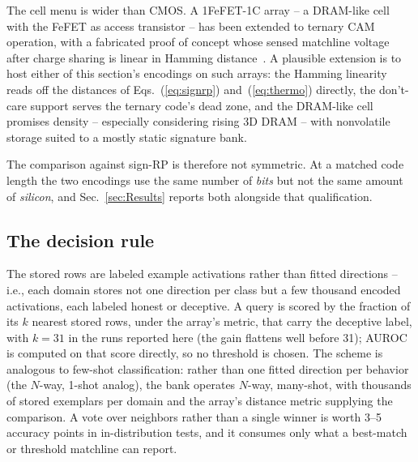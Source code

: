\documentclass[conference]{IEEEtran}
\newcommand{\cam}{{CAM}\xspace}
\newcommand{\fefet}{{FeFET}\xspace}
\newcommand{\auroc}{{AUROC}\xspace}
\newcommand{\signrp}{{sign-RP}\xspace}
\begin{document}
The cell menu is wider than CMOS. A 1\fefet-1C array -- a DRAM-like
cell with the \fefet as access transistor -- has been extended to
ternary \cam operation, with a fabricated proof of concept whose
sensed matchline voltage after charge sharing is linear in Hamming
distance~\cite{fefet1c2026}. A plausible extension is to host either
of this section's encodings on such arrays: the Hamming linearity
reads off the distances of Eqs.~(\ref{eq:signrp})
and~(\ref{eq:thermo}) directly, the don't-care support serves the
ternary code's dead zone, and the DRAM-like cell promises density --
especially considering rising 3D DRAM -- with nonvolatile storage
suited to a mostly static signature bank.

The comparison against \signrp is therefore not symmetric. At a matched
code length the two encodings use the same number of \emph{bits} but not
the same amount of \emph{silicon}, and Sec.~\ref{sec:Results} reports
both alongside that qualification.

\subsection{The decision rule}

\label{subsec:Decision}
The stored rows are labeled example activations rather than fitted
directions -- i.e., each domain stores not one direction per class
but a few thousand encoded activations, each labeled honest or
deceptive. A query is scored by the fraction of its $k$ nearest stored
rows, under the array's metric, that carry the deceptive label, with
$k=31$ in the runs reported here (the gain flattens well before 31);
\auroc is computed on that score directly, so no threshold is chosen. The scheme is analogous to few-shot classification:
rather than one fitted direction per behavior (the $N$-way, 1-shot
analog), the bank operates $N$-way, many-shot, with thousands of
stored exemplars per domain and the array's distance metric supplying
the comparison. A vote over neighbors rather than a single winner is
worth 3--5 accuracy points in in-distribution tests, and it consumes
only what a best-match or threshold matchline can report.
\end{document}
